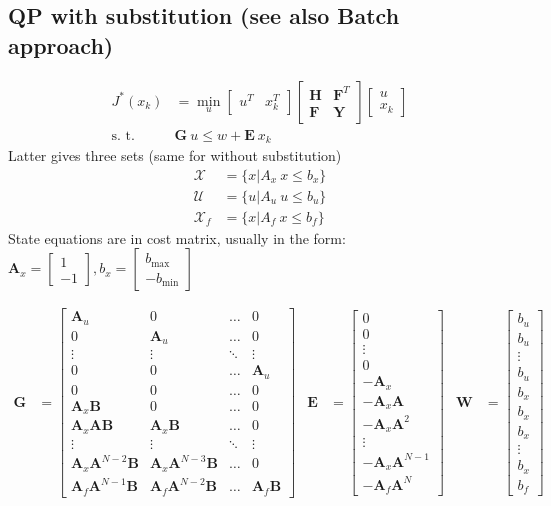\documentclass[landscape,a4paper,8pt]{scrartcl}
\newcommand{\mc}[1]{\mathcal{#1}}
\newcommand\vA{\bm{A}}
\newcommand\vB{\bm{B}}
\newcommand\vE{\bm{E}}
\newcommand\vF{\bm{F}}
\newcommand\vG{\bm{G}}
\newcommand\vH{\bm{H}}
\newcommand\vW{\bm{W}}
\newcommand\vY{\bm{Y}}
\newcommand{\Me}[1]{\begin{bmatrix}#1\end{bmatrix}} %
\begin{document}
\begin{multicols*}{3}
\subsection{QP with substitution (see also Batch approach)}\vspace*{-\baselineskip}
\begin{align*}
J^*(x_k) & = \min_u \Me{u^T & x_k^T}\Me{\vH & \vF^T \\ \vF & \vY}\Me{u \\ x_k} \\
\text{s. t. } & \vG\ u \leq w + \vE\ x_k
\end{align*}
Latter gives three sets (same for without substitution)
\begin{align*}
\mc{X}   & = \{ x | A_x\ x \leq b_x\} \\
\mc{U}   & = \{ u | A_u\ u \leq b_u\} \\
\mc X_f & = \{ x | A_f\ x \leq b_f\}
\end{align*}
State equations are in cost matrix, usually in the form: $\vA_x = \Me{1 \\ -1}, b_x = \Me{b_\text{max} \\ -b_\text{min}}$
\begin{scriptsize}
\setlength{\arraycolsep}{2pt}
\begin{align*}
\vG & = \Me{\vA_u & 0 & \dots & 0 \\
          0 & \vA_u & \dots & 0 \\
          \vdots & \vdots & \ddots & \vdots \\
					0      & 0 & \dots & \vA_u \\
					0      & 0 & \dots & 0 \\
					\vA_x\vB & 0 & \dots & 0 \\
					\vA_x\vA\vB & \vA_x\vB & \dots & 0 \\
					\vdots & \vdots & \ddots & \vdots \\
					\vA_x\vA^{N-2}\vB & \vA_x\vA^{N-3}\vB & \dots & 0 \\
					\vA_f\vA^{N-1}\vB & \vA_f\vA^{N-2}\vB & \dots & \vA_f\vB} &
\vE & = \Me{0 \\ 0 \\ \vdots \\ 0 \\ -\vA_x \\ -\vA_x\vA \\ -\vA_x\vA^2 \\ \vdots \\ -\vA_x\vA^{N-1} \\ -\vA_f\vA^N} &
\vW & = \Me{b_u \\ b_u \\ \vdots \\ b_u \\ b_x \\ b_x \\ b_x \\ \vdots \\ b_x \\ b_f}
\end{align*}
\end{scriptsize}
\vspace*{-\baselineskip}

\end{multicols*}
\end{document}
